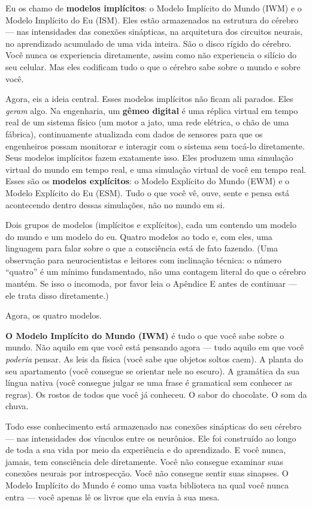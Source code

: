 \documentclass[11pt, twoside, openright]{book}
\begin{document}
Eu os chamo de \textbf{modelos implícitos}: o Modelo Implícito do Mundo (IWM) e o Modelo Implícito do Eu (ISM). Eles estão armazenados na estrutura do cérebro --- nas intensidades das conexões sinápticas, na arquitetura dos circuitos neurais, no aprendizado acumulado de uma vida inteira. São o disco rígido do cérebro. Você nunca os experiencia diretamente, assim como não experiencia o silício do seu celular. Mas eles codificam tudo o que o cérebro sabe sobre o mundo e sobre você.

Agora, eis a ideia central. Esses modelos implícitos não ficam ali parados. Eles \textit{geram} algo. Na engenharia, um \textbf{gêmeo digital} é uma réplica virtual em tempo real de um sistema físico (um motor a jato, uma rede elétrica, o chão de uma fábrica), continuamente atualizada com dados de sensores para que os engenheiros possam monitorar e interagir com o sistema sem tocá-lo diretamente. Seus modelos implícitos fazem exatamente isso. Eles produzem uma simulação virtual do mundo em tempo real, e uma simulação virtual de você em tempo real. Esses são os \textbf{modelos explícitos}: o Modelo Explícito do Mundo (EWM) e o Modelo Explícito do Eu (ESM). Tudo o que você vê, ouve, sente e pensa está acontecendo dentro dessas simulações, não no mundo em si.

Dois grupos de modelos (implícitos e explícitos), cada um contendo um modelo do mundo e um modelo do eu. Quatro modelos ao todo e, com eles, uma linguagem para falar sobre o que a consciência está de fato fazendo. (Uma observação para neurocientistas e leitores com inclinação técnica: o número ``quatro'' é um mínimo fundamentado, não uma contagem literal do que o cérebro mantém. Se isso o incomoda, por favor leia o Apêndice E antes de continuar --- ele trata disso diretamente.)

Agora, os quatro modelos.

\textbf{O Modelo Implícito do Mundo (IWM)} é tudo o que você sabe sobre o mundo. Não aquilo em que você está pensando agora --- tudo aquilo em que você \textit{poderia} pensar. As leis da física (você sabe que objetos soltos caem). A planta do seu apartamento (você consegue se orientar nele no escuro). A gramática da sua língua nativa (você consegue julgar se uma frase é gramatical sem conhecer as regras). Os rostos de todos que você já conheceu. O sabor do chocolate. O som da chuva.

Todo esse conhecimento está armazenado nas conexões sinápticas do seu cérebro --- nas intensidades dos vínculos entre os neurônios. Ele foi construído ao longo de toda a sua vida por meio da experiência e do aprendizado. E você nunca, jamais, tem consciência dele diretamente. Você não consegue examinar suas conexões neurais por introspecção. Você não consegue sentir suas sinapses. O Modelo Implícito do Mundo é como uma vasta biblioteca na qual você nunca entra --- você apenas lê os livros que ela envia à sua mesa.
\end{document}
